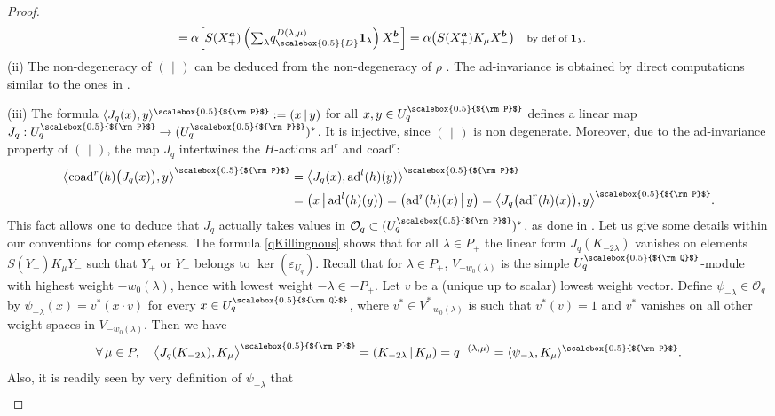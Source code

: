 \documentclass[11pt]{amsart}
\newcommand{\Oo}{\mathcal{O}}
\newcommand{\qD}{q_{\scalebox{0.5}{D}}}
\newcommand{\Q}{{\scalebox{0.5}{${\rm Q}$}}}
\newcommand{\Pup}{{\scalebox{0.5}{${\rm P}$}}}
\begin{document}
\begin{proof}
\begin{align*}
=\:& \alpha\!\left[ S(X_+^{\boldsymbol{a}}) \left({\textstyle \sum_\lambda} \qD^{D(\lambda,\mu)} \boldsymbol{1}_\lambda \right) X_-^{\boldsymbol{b}} \right ] = \alpha\bigl( S(X_+^{\boldsymbol{a}}) K_\mu X_-^{\boldsymbol{b}} \bigr) \quad \text{\footnotesize by def of $\boldsymbol{1}_\lambda$.}
\end{align*}
(ii) The non-degeneracy of $(\:\,|\,\:)$  can be deduced from the non-degeneracy of $\rho$ \cite[Th.\,3.92]{VY}. The ad-invariance is obtained by direct computations similar to the ones in \cite[Prop.\,3.79]{VY}. 

\indent (iii) The formula $\langle J_q(x),y\rangle^\Pup := (x \,|\, y)$ for all $x,y\in U_q^\Pup$ defines a linear map $J_q: U_q^\Pup \to (U_q^\Pup)^*$. It is injective, since $(\:\,|\,\:)$ is non degenerate. Moreover, due to the ad-invariance property of $(\:\,|\,\:)$, the map $J_q$ intertwines the $H$-actions $\mathrm{ad}^r$ and $\mathrm{coad}^r$:
\begin{align*}
\bigl\langle \mathrm{coad}^r(h)\bigl(J_q(x)\bigr),y \bigr\rangle^\Pup &= \bigl\langle J_q(x), \mathrm{ad}^l(h)(y) \bigr\rangle^\Pup\\
&= \bigl( x \,\big|\, \mathrm{ad}^l(h)(y) \bigr) = \bigl( \mathrm{ad}^r(h)(x) \,\big|\, y \bigr) = \bigl\langle J_q\bigl(\mathrm{ad}^r(h)(x)\bigr), y \bigr\rangle^\Pup.
\end{align*}
This fact allows one to deduce that $J_q$ actually takes values in $\mathcal{O}_q \subset (U_q^\Pup)^*$, as done in \cite[Prop.\,3.116]{VY}. Let us give some details within our conventions for completeness. The formula \eqref{qKillingnous} shows that for all $\lambda\in P_+$ the linear form $J_q(K_{-2\lambda})$ vanishes on elements $S(Y_+)K_\mu Y_-$ such that $Y_+$ or $Y_-$ belongs to $\ker(\varepsilon_{U_q})$. Recall that for $\lambda \in P_+$, $V_{-w_0(\lambda)}$ is the simple $U_q^\Q$-module with highest weight $-w_0(\lambda)$, hence with lowest weight $-\lambda \in -P_+$. Let $v$ be a (unique up to scalar) lowest weight vector. Define $\psi_{-\lambda}\in \Oo_q$ by $\psi_{-\lambda}(x) = v^*(x\cdot v)$ for every $x\in U_q^\Q$, where $v^*\in V_{-w_0(\lambda)}^*$ is such that $v^*(v)=1$ and $v^*$ vanishes on all other weight spaces in $V_{-w_0(\lambda)}$. Then we have
\[ \forall \, \mu \in P, \quad \bigl\langle J_q(K_{-2\lambda}), K_\mu \bigr\rangle^\Pup = ( K_{-2\lambda} \,|\, K_\mu) = q^{-(\lambda,\mu)} =  \langle \psi_{-\lambda}, K_\mu \rangle^\Pup. \]
Also, it is readily seen by very definition of $\psi_{-\lambda}$ that
\begin{align*}

\end{align*}
\end{proof}
\end{document}
